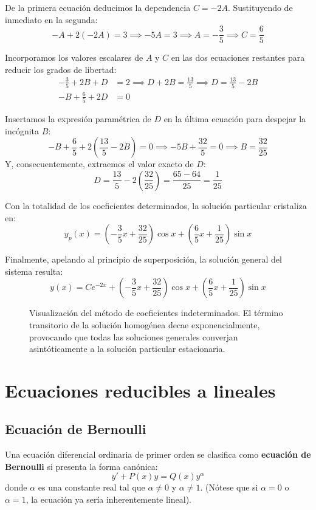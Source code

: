 \begin{tcolorbox}
De la primera ecuación deducimos la dependencia $C = -2A$. Sustituyendo de inmediato en la segunda:
$$ -A + 2(-2A) = 3 \implies -5A = 3 \implies A = -\frac{3}{5} \implies C = \frac{6}{5} $$

Incorporamos los valores escalares de $A$ y $C$ en las dos ecuaciones restantes para reducir los grados de libertad:
\begin{align*}
    -\frac{3}{5} + 2B + D &= 2 \implies D + 2B = \frac{13}{5} \implies D = \frac{13}{5} - 2B \\
    -B + \frac{6}{5} + 2D &= 0 
\end{align*}

Insertamos la expresión paramétrica de $D$ en la última ecuación para despejar la incógnita $B$:
$$ -B + \frac{6}{5} + 2\left(\frac{13}{5} - 2B\right) = 0 \implies -5B + \frac{32}{5} = 0 \implies B = \frac{32}{25} $$
Y, consecuentemente, extraemos el valor exacto de $D$:
$$ D = \frac{13}{5} - 2\left(\frac{32}{25}\right) = \frac{65 - 64}{25} = \frac{1}{25} $$

Con la totalidad de los coeficientes determinados, la solución particular cristaliza en:
$$ y_p(x) = \left(-\frac{3}{5}x + \frac{32}{25}\right)\cos x + \left(\frac{6}{5}x + \frac{1}{25}\right)\sin x $$

Finalmente, apelando al principio de superposición, la solución general del sistema resulta:
$$ y(x) = C e^{-2x} + \left(-\frac{3}{5}x + \frac{32}{25}\right)\cos x + \left(\frac{6}{5}x + \frac{1}{25}\right)\sin x $$

\begin{figure}[H]
    \centering
    
    \caption{Visualización del método de coeficientes indeterminados. El término transitorio de la solución homogénea decae exponencialmente, provocando que todas las soluciones generales converjan asintóticamente a la solución particular estacionaria.}
\end{figure}
\end{tcolorbox}
\newpage

\section{Ecuaciones reducibles a lineales}

\subsection{Ecuación de Bernoulli}

\begin{definicion}
Una ecuación diferencial ordinaria de primer orden se clasifica como \textbf{ecuación de Bernoulli} si presenta la forma canónica:
$$ y' + P(x)y = Q(x)y^\alpha $$
donde $\alpha$ es una constante real tal que $\alpha \neq 0$ y $\alpha \neq 1$. (Nótese que si $\alpha=0$ o $\alpha=1$, la ecuación ya sería inherentemente lineal).
\end{definicion}

